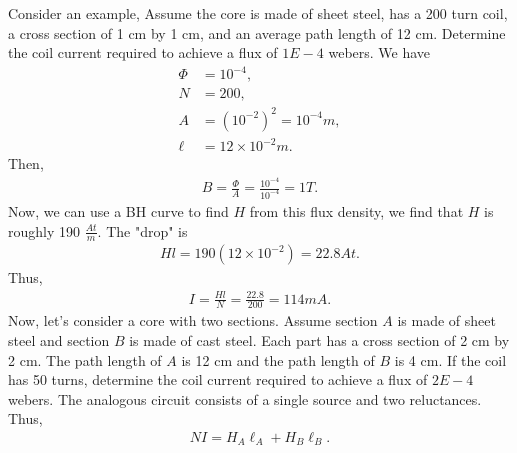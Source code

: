 \documentclass{report}
\begin{document}
\begin{itemize}
            \bigbreak \noindent 
            \bigbreak \noindent 
            Consider an example, 
            \bigbreak \noindent 
            \bigbreak \noindent 
            Assume the core is made of sheet steel, has a 200 turn coil, a cross section of 1 cm by 1 cm, and an average path length of 12 cm. Determine the coil current required to achieve a flux of $1E-4$ webers.
            \bigbreak \noindent 
            We have
            \begin{align*}
                \Phi &= 10^{-4},\\
                N &= 200, \\
                A &= (10^{-2})^{2} = 10^{-4}m, \\
                \ell &= 12 \times 10^{-2}m
            .\end{align*}
            Then,
            \begin{align*}
                B = \frac{\Phi}{A} = \frac{10^{-4}}{10^{-4}} = 1T
            .\end{align*}
            Now, we can use a BH curve to find $H$ from this flux density, we find that $H$ is roughly 190 $\frac{At}{m}$.
            \bigbreak \noindent 
            The "drop" is
            \begin{align*}
                Hl = 190(12\times 10^{-2}) = 22.8 At
            .\end{align*}
            Thus,
            \begin{align*}
                I = \frac{Hl}{N} = \frac{22.8}{200} = 114mA
            .\end{align*}
            Now, let's consider a core with two sections.
            \bigbreak \noindent
            \bigbreak \noindent 
            Assume section $A$ is made of sheet steel and section $B$ is made of cast steel. Each part has a cross section of 2 cm by 2 cm. The path length of $A$ is 12 cm and the path length of $B$ is 4 cm. If the coil has 50 turns, determine the coil current required to achieve a flux of $2E-4$ webers.
            \bigbreak \noindent 
            The analogous circuit consists of a single source and two reluctances. Thus,
            \begin{align*}
                NI = H_{A}\ell_{A} + H_{B}\ell_{B}
            .\end{align*}
            \bigbreak \noindent 
            \bigbreak \noindent 

\end{itemize}
\end{document}
